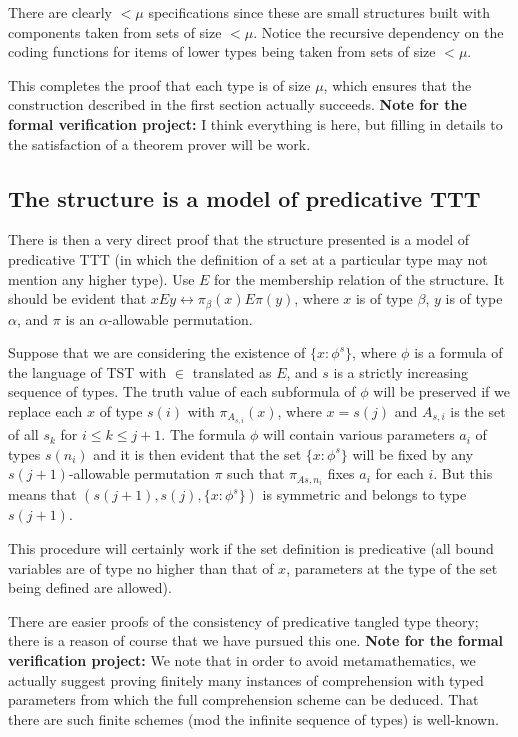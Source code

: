 \documentclass[112pt]{article}
\begin{document}
There are clearly $<\mu$ specifications since these are small structures built with components taken from sets of size $<\mu$.  Notice the recursive dependency on the coding functions for items of lower types being taken from sets of size $<\mu$.

This completes the proof that each type is of size $\mu$, which ensures that the construction described in the first section actually succeeds.
{\bf Note for the formal verification project:}  I think everything is here, but filling in details to the satisfaction of a theorem prover will be work.
\newpage
\subsection{The structure is a model of predicative TTT}

There is then a very direct proof that the structure presented is a model of predicative TTT (in which the definition of a set at a particular type may not mention any higher type).  Use $E$ for the membership relation of the structure.  It should be evident that $x E y \leftrightarrow \pi_\beta(x) E \pi(y)$,
where $x$ is of type $\beta$, $y$ is of type $\alpha$, and $\pi$ is an $\alpha$-allowable permutation.

Suppose that we are considering the existence of $\{x : \phi^s\}$, where $\phi$ is a formula of the language of TST with $\in$ translated as $E$, and $s$ is a strictly increasing sequence of types.  The truth value of each subformula of $\phi$ will be preserved if we replace each $x$ of type $s(i)$ with $\pi_{A_{s,i}}(x)$, where
$x=s(j)$ and $A_{s,i}$ is the set of all $s_k$ for $i \leq k \leq j+1$.  The formula $\phi$ will contain various parameters $a_i$ of types $s(n_i)$ and it is then evident that the set $\{x : \phi^s\}$ will be fixed by any $s(j+1)$-allowable permutation $\pi$ such that $\pi_{A{s,n_i}}$ fixes $a_i$ for each $i$.  But this means that
$(s(j+1),s(j),\{x : \phi^s\})$ is symmetric and belongs to type $s(j+1)$.

This procedure will certainly work if the set definition is predicative (all bound variables are of type no higher than that of $x$, parameters at the type
of the set being defined are allowed).

There are easier proofs of the consistency of predicative tangled type theory;  there is a reason of course that we have pursued this one.
{\bf Note for the formal verification project:}  We note that in order to avoid metamathematics, we actually suggest proving finitely many instances of comprehension with typed parameters from which the full comprehension scheme can be deduced.  That there are such finite schemes (mod the infinite sequence of types) is well-known.
\end{document}

